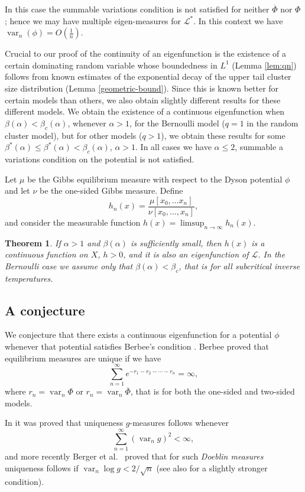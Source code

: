 \documentclass[11pt, a4paper]{amsart}
\newtheorem{thm}{Theorem}
\theoremstyle{definition}
\theoremstyle{remark}
\providecommand{\mc}{\mathcal}
\providecommand{\opn}{\operatorname}
\providecommand{\ol}{\overline}
\providecommand{\var}{\opn{var}}
\def\X{X}
\begin{document}
In this case the summable variations condition is not satisfied for neither
$\ol\Phi$ nor $\Phi$; hence we may have multiple eigen-measures for $\mc{L}^*$. In
this context we have $\var_n(\phi)=O(\frac{1}{n})$.

Crucial to our proof of the continuity of an eigenfunction is the existence of a certain dominating random variable whose boundedness in $L^1$ (Lemma \ref{lem:qn}) follows from known estimates of the exponential decay of the upper tail cluster size distribution (Lemma \ref{geometric-bound}). Since this is known better for certain models than others, we also obtain slightly different results for these different models. We obtain the existence of a continuous eigenfunction when $\beta(\alpha)<\beta_c(\alpha)$, whenever $\alpha>1$, for the Bernoulli model ($q=1$ in the random cluster model), but for other models ($q>1$), we obtain these results for some $\beta^*(\alpha) \leq \beta^*(\alpha) <\beta_c (\alpha)$, $\alpha>1$. In all cases we have $\alpha\leq 2$, summable a variations condition on the potential is not satisfied.

Let $\mu$ be the Gibbs equilibrium measure with respect
to the Dyson potential $\phi$ and let $\nu$ be the one-sided Gibbs measure.
Define
$$
h_n(x)=\frac{\mu[x_0,\ldots x_n]}{\nu[x_0,\ldots, x_n]},
$$
and consider the measurable function $h(x)=\limsup_{n\to \infty}h_n(x)$. 

\begin{thm}\label{main} 
If $\alpha>1$ and $\beta(\alpha)$ is sufficiently small, then $h(x)$ is a continuous function on $\X$, $h>0$, and it is also an eigenfunction of $\mc{L}$. In the Bernoulli case we assume only that $\beta(\alpha)<\beta_c$, that is for all subcritical inverse temperatures.
\end{thm}

\subsection{A conjecture}
We conjecture that there exists a continuous eigenfunction for a potential
$\phi$ whenever that potential satisfies Berbee's condition \cite{berbee89}. Berbee proved that equilibrium measures are unique if we have
\begin{equation}\label{berbee}
  \sum_{n=1}^\infty e^{-r_1-r_2-\cdots-r_n}=\infty,
\end{equation}
where $r_n=\var_n \Phi$ or $r_n=\var_n \ol\Phi$, that is for both the one-sided and two-sided models.

In \cite{johob} it was proved that uniqueness $g$-measures follows
whenever
$$ \sum_{n=1}^\infty (\var_n g)^2<\infty, $$
and more recently Berger et al.\ \cite{berger2} proved that for such {\em Doeblin
measures} uniqueness follows if $\var_n \log g <2/\sqrt{n}$ (see also
\cite{johob3} for a slightly stronger condition).
\end{document}
